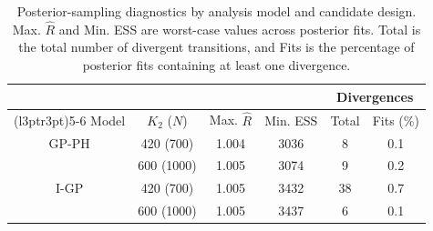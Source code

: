\begin{table}[!htbp]
\centering
\caption{\label{tableBDCT_Supp_MCMC_diagnostics}Posterior-sampling diagnostics by analysis model and candidate design. Max. $\widehat{R}$ and Min. ESS are worst-case values across posterior fits. Total is the total number of divergent transitions, and Fits is the percentage of posterior fits containing at least one divergence.}
\centering
\begin{tabular}[t]{cccccc}
\toprule
\multicolumn{4}{c}{ } & \multicolumn{2}{c}{Divergences} \\
\cmidrule(l{3pt}r{3pt}){5-6}
Model & $K_{2}$ ($N$) & Max. $\widehat{R}$ & Min. ESS & Total & Fits (\%)\\
\midrule
GP-PH & 420 (700) & 1.004 & 3036 & 8 & 0.1\\
 & 600 (1000) & 1.005 & 3074 & 9 & 0.2\\
I-GP & 420 (700) & 1.005 & 3432 & 38 & 0.7\\
 & 600 (1000) & 1.005 & 3437 & 6 & 0.1\\
\bottomrule
\end{tabular}
\end{table}
